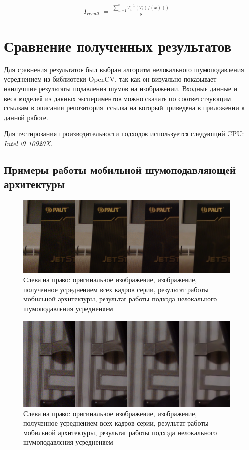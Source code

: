 \documentclass[14pt]{mmcs_article}
\begin{document}
\begin{eqnarray}\label{eq:times_series_augmentation}
I_{result}\ =\ \frac{\sum_{n=1}^{8} T_{i}^{-1}(T_{i}(f(x)))}{8}
\end{eqnarray}

\section{Сравнение полученных результатов}

Для сравнения результатов был выбран алгоритм нелокального шумоподавления усреднением из библиотеки OpenCV, так как он визуально показывает наилучшие результаты подавления шумов на изображении. Входные данные и веса моделей из данных экспериментов можно скачать по соответствующим ссылкам в описании репозитория, ссылка на который приведена в приложении к данной работе.

Для тестирования производительности подходов используется следующий CPU: \textit{Intel i9 10920X}.

\subsection{Примеры работы мобильной шумоподавляющей архитектуры}
\label{sec:mobile_net_test}

\begin{figure}[H]
	\centering
	\includegraphics[width=\textwidth]{img/real_noise_mobile}
	\caption{Слева на право: оригинальное изображение, изображение, полученное усреднением всех кадров серии, результат работы мобильной архитектуры, результат работы подхода нелокального шумоподавления усреднением}
	\label{fig:real_noise_mobile}
\end{figure}

\begin{figure}[H]
	\centering
	\includegraphics[width=\textwidth]{img/real_noise_mobile_2}
	\caption{Слева на право: оригинальное изображение, изображение, полученное усреднением всех кадров серии, результат работы мобильной архитектуры, результат работы подхода нелокального шумоподавления усреднением}
	\label{fig:real_noise_mobile_2}
\end{figure}
\end{document}
